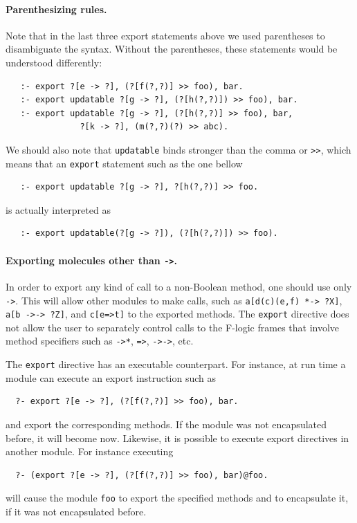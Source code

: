 \documentclass[11pt]{article}
\begin{document}
\paragraph{Parenthesizing rules.}
Note that in the last three export statements above we used parentheses to
disambiguate the syntax. Without the parentheses, these statements would be
understood differently:
\begin{verbatim}
   :- export ?[e -> ?], (?[f(?,?)] >> foo), bar.
   :- export updatable ?[g -> ?], (?[h(?,?)]) >> foo), bar.
   :- export updatable ?[g -> ?], (?[h(?,?)] >> foo), bar,
               ?[k -> ?], (m(?,?)(?) >> abc).  
\end{verbatim}
We should also note that {\tt updatable} binds stronger than the comma or
{\tt >>}, which means that an {\tt export} statement such as the one bellow
\begin{verbatim}
   :- export updatable ?[g -> ?], ?[h(?,?)] >> foo.
\end{verbatim}
is actually interpreted as
\begin{verbatim}
   :- export updatable(?[g -> ?]), (?[h(?,?)]) >> foo).
\end{verbatim}

\paragraph{Exporting molecules other than {\tt ->}.}  
In order to export any kind of call to a non-Boolean
method, one should use only {\tt ->}. This will
allow other modules to make calls, such as {\tt a[d(c)(e,f) *-> ?X]}, {\tt
  a[b ->-> ?Z]}, and {\tt c[e=>t]}  to the exported methods.  The {\tt export}
directive does not allow the user to separately control calls to the
F-logic frames that involve method specifiers such as {\tt ->*}, {\tt =>},
{\tt ->->}, etc.

The {\tt export} directive has an executable counterpart. For instance, at
run time a module can execute an export instruction such as 
\begin{verbatim}
  ?- export ?[e -> ?], (?[f(?,?)] >> foo), bar.  
\end{verbatim}
and export the corresponding methods. If the module was not encapsulated
before, it will become now. Likewise, it is possible to execute export
directives in another module. For instance executing
\begin{verbatim}
  ?- (export ?[e -> ?], (?[f(?,?)] >> foo), bar)@foo.
\end{verbatim}
will cause the module {\tt foo} to export the specified methods and to
encapsulate it, if it was not encapsulated before. 
\end{document}
